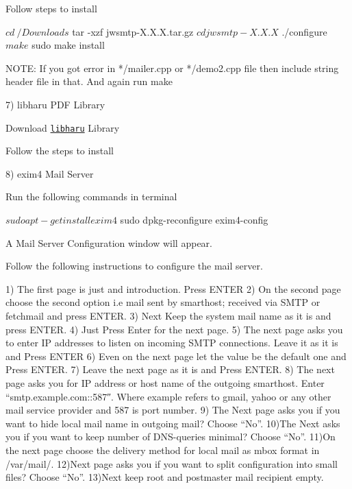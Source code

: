 Follow steps to install \begin{DoxyVerb}$ cd ~/Downloads
$ tar -xzf jwsmtp-X.X.X.tar.gz
$ cd jwsmtp-X.X.X
$ ./configure
$ make
$ sudo make install

NOTE: If you got error in */mailer.cpp or */demo2.cpp file then
include string header file in that. And again run make
\end{DoxyVerb}


7) libharu P\-D\-F Library

Download \href{https://github.com/libharu/libharu/tarball/master}{\tt libharu} Library

Follow the steps to install 


8) exim4 Mail Server

Run the following commands in terminal \begin{DoxyVerb}$ sudo apt-get install exim4
$ sudo dpkg-reconfigure exim4-config
\end{DoxyVerb}


A Mail Server Configuration window will appear.\par
 Follow the following instructions to configure the mail server. \begin{DoxyVerb}1) The first page is just and introduction. Press ENTER
2) On the second page choose the second option i.e 
   mail sent by smarthost; received via SMTP or fetchmail and 
   press ENTER.
3) Next Keep the system mail name as it is and press ENTER.
4) Just Press Enter for the next page.
5) The next page asks you to enter IP addresses to listen on
   incoming SMTP connections. Leave it as it is and Press ENTER
6) Even on the next page let the value be the default one and 
   Press ENTER.
7) Leave the next page as it is and Press ENTER.
8) The next page asks you for IP address or host name of the outgoing
   smarthost. Enter “smtp.example.com::587″. Where example refers to
   gmail, yahoo or any other mail service provider and 587 is port number.
9) The Next page asks you if you want to hide local mail name in 
   outgoing mail? Choose “No”.
10)The Next asks you if you want to keep number of DNS-queries minimal?
   Choose “No”.
11)On the next page choose the  delivery method for local mail as
   mbox format in /var/mail/.
12)Next page asks you if you want to split configuration into small
   files? Choose “No”. 
13)Next keep root and postmaster mail recipient empty.
\end{DoxyVerb}


